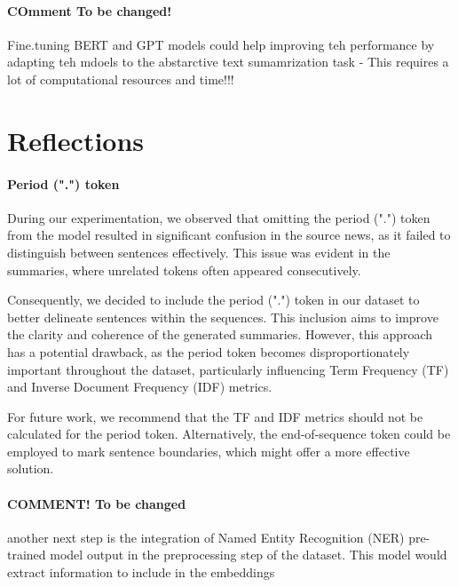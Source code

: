 \documentclass[a4paper, 11pt]{article}
\begin{document}
\paragraph{COmment To be changed!}Fine.tuning BERT and GPT models could help improving teh performance by adapting teh mdoels to the abstarctive text sumamrization task - This requires a lot of computational resources and time!!!

\section{Reflections}
\paragraph{Period (".") token}
During our experimentation, we observed that omitting the period (".") token from the model resulted in significant confusion in the source news, as it failed to distinguish between sentences effectively. This issue was evident in the summaries, where unrelated tokens often appeared consecutively.

Consequently, we decided to include the period (".") token in our dataset to better delineate sentences within the sequences. This inclusion aims to improve the clarity and coherence of the generated summaries. However, this approach has a potential drawback, as the period token becomes disproportionately important throughout the dataset, particularly influencing Term Frequency (TF) and Inverse Document Frequency (IDF) metrics.

For future work, we recommend that the TF and IDF metrics should not be calculated for the period token. Alternatively, the end-of-sequence token could be employed to mark sentence boundaries, which might offer a more effective solution.

\paragraph{COMMENT! To be changed}another next step is the integration of Named Entity Recognition (NER) pre-trained model output in the preprocessing step of the dataset. This model would extract information  to include in the embeddings  


\end{document}
